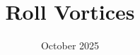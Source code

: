 
\usepackage[style=authoryear, backend=biber]{biblatex}

\graphicspath{{FIGURES/}}



\title{Roll Vortices}
\date{October 2025}

\tableofcontents


%

%

\printbibliography


